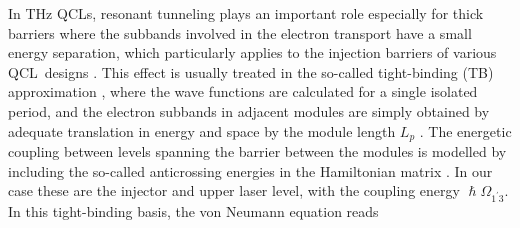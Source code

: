 \documentclass[10pt]{article}
\begin{document}
	In THz QCLs, resonant tunneling plays an important role especially for thick
	barriers where the subbands involved in the electron transport have a small
	energy separation, which particularly applies to the injection barriers of
	various QCL\ designs
	\cite{callebaut2005importance,kumar2009coherence,dupont2010simplified}. This
	effect is usually treated in the so-called tight-binding (TB) approximation
	\cite{bastardwave}, where the wave functions are calculated for a single
	isolated period, and the electron subbands in adjacent modules are simply
	obtained by adequate translation in energy and space by the module length
	$L_{p}$ \cite{callebaut2005importance}. The energetic coupling between levels
	spanning the barrier between the modules is modelled by including the
	so-called anticrossing energies in the Hamiltonian matrix
	\cite{kumar2009coherence,dupont2010simplified}. In our case these are the
	injector and upper laser level, with the coupling energy $\hslash\Omega
	_{1^{\prime}3}$. In this tight-binding basis, the von Neumann equation reads
\end{document}
